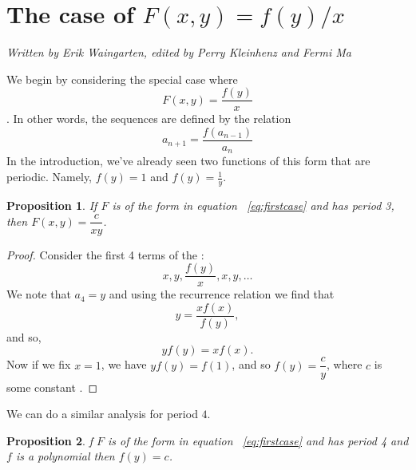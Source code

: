 \documentclass[12pt]{article}
\newtheorem{proposition}{Proposition}
\begin{document}
\section{The case of $F(x,y) = f(y)/x$}
\emph{Written by Erik Waingarten, edited by Perry Kleinhenz and Fermi Ma}

We begin by considering the special case where 
\begin{equation}\label{eq:firstcase}
F(x,y) = \dfrac{f(y)}{x}
\end{equation}. In other words, the sequences are defined by the relation
\begin{equation*}
a_{n+1} = \dfrac{f(a_{n-1})}{a_n}
\end{equation*}
In the introduction, we've already seen two functions of this form that are periodic. Namely, $f(y) = 1$ and $f(y) = \frac{1}{y}$. 

\begin{proposition}
If $F$ is of the form in equation ~\ref{eq:firstcase} and has period 3, then $F(x,y) = \dfrac{c}{xy}$.
\end{proposition}

\begin{proof}
Consider the first 4 terms of the :
\begin{equation*}
x, y, \dfrac{f(y)}{x}, x, y, \dots 
\end{equation*}
We note that $a_4=y$ and using the recurrence relation we find that 
\begin{equation*}
y = \dfrac{xf(x)}{f(y)},
\end{equation*}
and so,
\begin{equation*} 
y f(y) = x f(x).
\end{equation*}
Now if we fix $x = 1$, we have $y f(y) = f(1)$, and so $f(y) = \dfrac{c}{y}$, where $c$ is some constant .
\end{proof}

We can do a similar analysis for period $4$.
\begin{proposition}
f $F$ is of the form in equation ~\ref{eq:firstcase} and has period 4 and $f$ is a polynomial then $f(y) = c$. 
\end{proposition}
\end{document}
